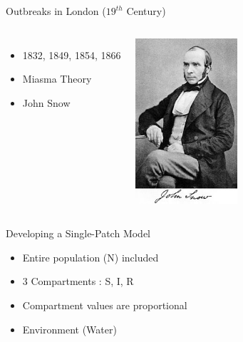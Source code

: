 \documentclass{beamer}\usepackage[]{graphicx}\usepackage[]{color}
\begin{document}
\begin{frame}{Outbreaks in London ($19^{th}$ Century)}
\begin{columns}[onlytextwidth]
\begin{itemize}
\setlength\itemsep{2em}
\item 1832, 1849, 1854, 1866
\item Miasma Theory
\item John Snow  
\end{itemize}
\includegraphics[width=0.65\textwidth]{Snow.jpg}
\end{columns}
\end{frame}

\begin{frame}{Developing a Single-Patch Model}
\begin{itemize}
\setlength\itemsep{2em}
\item Entire population (N) included
\item 3 Compartments : S, I, R
\item Compartment values are proportional
\item Environment (Water)
\end{itemize}
\end{frame}
\end{document}
